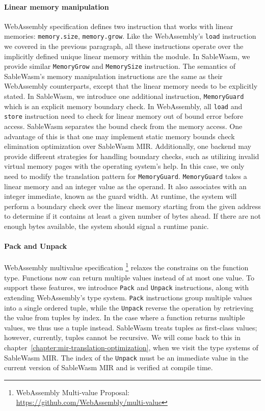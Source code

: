 \paragraph{Linear memory manipulation}
WebAssembly specification defines two instruction that works with linear
memories: \texttt{memory.size}, \texttt{memory.grow}. Like the WebAssembly's
\texttt{load} instruction we covered in the previous paragraph, all these
instructions operate over the implicitly defined unique linear memory within the
module. In SableWasm, we provide similar \texttt{MemoryGrow} and
\texttt{MemorySize} instruction. The semantics of SableWasm's memory
manipulation instructions are the same as their WebAssembly counterparts, except
that the linear memory needs to be explicitly stated. In SableWasm, we introduce
one additional instruction, \texttt{MemoryGuard} which is an explicit memory
boundary check. In WebAssembly, all \texttt{load} and \texttt{store} instruction
need to check for linear memory out of bound error before access. SableWasm
separates the bound check from the memory access. One advantage of this is that
one may implement static memory bounds check elimination optimization over
SableWasm MIR. Additionally, one backend may provide different strategies for
handling boundary checks, such as utilizing invalid virtual memory pages with
the operating system's help. In this case, we only need to modify the
translation pattern for \texttt{MemoryGuard}. \texttt{MemoryGuard} takes a
linear memory and an integer value as the operand. It also associates with an
integer immediate, known as the guard width. At runtime, the system will perform
a boundary check over the linear memory starting from the given address to
determine if it contains at least a given number of bytes ahead. If there are
not enough bytes available, the system should signal a runtime panic.

\paragraph{Pack and Unpack}
WebAssembly multivalue specification \footnote{WebAssembly Multi-value Proposal:
  \url{https://github.com/WebAssembly/multi-value}} relaxes the constrains on
the function type. Functions now can return multiple values instead of at most
one value. To support these features, we introduce \texttt{Pack} and
\texttt{Unpack} instructions, along with extending WebAssembly's type system.
\texttt{Pack} instructions group multiple values into a single ordered tuple,
while the \texttt{Unpack} reverse the operation by retrieving the value from
tuples by index. In the case where a function returns multiple values, we thus
use a tuple instead. SableWasm treats tuples as first-class values; however,
currently, tuples cannot be recursive. We will come back to this
in chapter~\ref{chapter:mir-translation-optimization},
when we visit the type systems of SableWasm MIR. The index of the
\texttt{Unpack} must be an immediate value in the current version of SableWasm
MIR and is verified at compile time.


